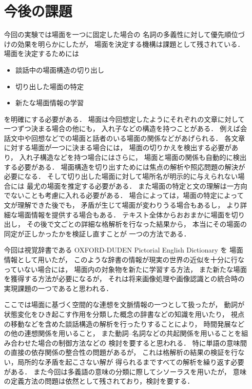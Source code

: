 \section{今後の課題}

今回の実験では場面を一つに固定した場合の
名詞の多義性に対して優先順位づけの効果を明らかにしたが，
場面を決定する機構は課題として残されている．
場面を決定するためには
\begin{itemize}
  \item 談話中の場面構造の切り出し
  \item 切り出した場面の特定
  \item 新たな場面情報の学習
\end{itemize}
を明確にする必要がある．
場面は今回想定したようにそれぞれの文章に対して一つずつ決まる場合の他にも，
入れ子などの構造を持つことがある．
例えば会話文中や回想などでの場面と話者のいる場面の関係などがあげられる．
各文章に対する場面が一つに決まる場合には，
場面の切りかえを検出する必要があり，
入れ子構造などを持つ場合にはさらに，
場面と場面の関係も自動的に検出する必要がある．
場面構造を切り出すためには焦点の解析や照応問題の解決が
必要になる\cite{Tsunoda94a}．
そして切り出した場面に対して場所名が明示的に与えられない場合には
最尤の場面を推定する必要がある\cite{Tsunoda94b}．
また場面の特定と文の理解は一方向でないことも考慮に入れる必要がある．
場合によっては，場面の特定によって文が理解できた後でも，
矛盾が生じて場面が変わりうる場合もあるし，
より詳細な場面情報を提供する場合もある．
テキスト全体からおおまかに場面を切り出し，
その後で文ごとの詳細な格解析を行なった結果から，
本当にその場面の同定が正しかったかを検証し直すことが
一つの方法である．

今回は視覚辞書である OXFORD-DUDEN Pictorial English Dictionary を
場面情報として用いたが，
このような辞書の情報が現実の世界の近似を十分に行なっていない場合には，
場面内の対象物を新たに学習する方法，
また新たな場面を獲得する方法が必要になるが，
それは将来画像処理や画像認識との統合時の実現課題の一つであると思われる．

ここでは場面に基づく空間的な連想を文脈情報の一つとして扱ったが，
動詞が状態変化をひき起こす作用を分類した概念の辞書などの知識を用いたり，
視点の移動などを含めた談話構造の解析を行ったりすることにより，
時間発展などの他の連想関係を用いること，
また動詞--名詞などの共起関係を用いることを組み合わせた場合の制御方法などの
検討を要すると思われる．
特に単語の意味間の直接の依存関係の整合性の問題があるが，
これは格解析の結果の検証を行ない，局所的な矛盾を起こさない解が
得られるまですべての解析を繰り返す必要がある．
また今回は多義語の意味の分類に際してシソーラスを用いたが，
意味の定義方法の問題は依然として残されており，検討を要する．

